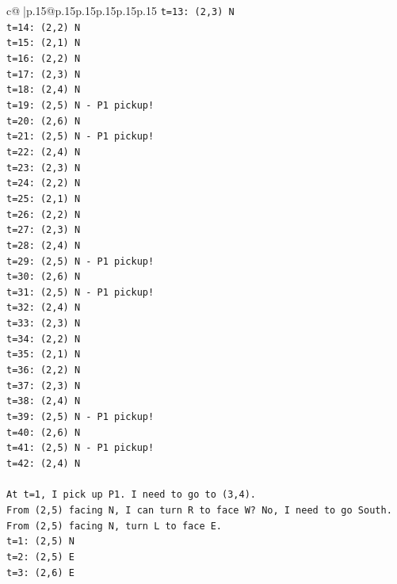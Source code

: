 \documentclass{article}
\begin{document}
{\begin{supertabular}{c@{$\;$}|p{.15\linewidth}@{}p{.15\linewidth}p{.15\linewidth}p{.15\linewidth}p{.15\linewidth}p{.15\linewidth}}
{{{\texttt{t=13: (2,3) N} \\
\texttt{t=14: (2,2) N} \\
\texttt{t=15: (2,1) N} \\
\texttt{t=16: (2,2) N} \\
\texttt{t=17: (2,3) N} \\
\texttt{t=18: (2,4) N} \\
\texttt{t=19: (2,5) N {-} P1 pickup!} \\
\texttt{t=20: (2,6) N} \\
\texttt{t=21: (2,5) N {-} P1 pickup!} \\
\texttt{t=22: (2,4) N} \\
\texttt{t=23: (2,3) N} \\
\texttt{t=24: (2,2) N} \\
\texttt{t=25: (2,1) N} \\
\texttt{t=26: (2,2) N} \\
\texttt{t=27: (2,3) N} \\
\texttt{t=28: (2,4) N} \\
\texttt{t=29: (2,5) N {-} P1 pickup!} \\
\texttt{t=30: (2,6) N} \\
\texttt{t=31: (2,5) N {-} P1 pickup!} \\
\texttt{t=32: (2,4) N} \\
\texttt{t=33: (2,3) N} \\
\texttt{t=34: (2,2) N} \\
\texttt{t=35: (2,1) N} \\
\texttt{t=36: (2,2) N} \\
\texttt{t=37: (2,3) N} \\
\texttt{t=38: (2,4) N} \\
\texttt{t=39: (2,5) N {-} P1 pickup!} \\
\texttt{t=40: (2,6) N} \\
\texttt{t=41: (2,5) N {-} P1 pickup!} \\
\texttt{t=42: (2,4) N} \\
\\ 
\texttt{At t=1, I pick up P1. I need to go to (3,4).} \\
\texttt{From (2,5) facing N, I can turn R to face W? No, I need to go South.} \\
\texttt{From (2,5) facing N, turn L to face E.} \\
\texttt{t=1: (2,5) N} \\
\texttt{t=2: (2,5) E} \\
\texttt{t=3: (2,6) E} \\
}}}
\end{supertabular}}
\end{document}
